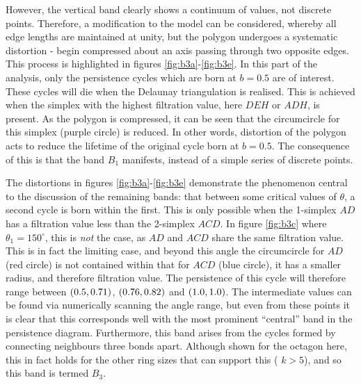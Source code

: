 However, the vertical band clearly shows a continuum of values, not discrete points.
Therefore, a modification to the model can be considered, whereby all edge lengths are maintained at unity, but the polygon undergoes a systematic distortion - begin compressed about an axis passing through two opposite edges.
This process is highlighted in figures \ref{fig:b3a}\--\ref{fig:b3e}.
In this part of the analysis, only the persistence cycles which are born at $b=0.5$ are of interest.
These cycles will die when the Delaunay triangulation is realised.
This is achieved when the simplex with the highest filtration value, here $DEH$ or $ADH$, is present.
As the polygon is compressed, it can be seen that the circumcircle for this simplex (purple circle) is reduced.
In other words, distortion of the polygon acts to reduce the lifetime of the original cycle born at $b=0.5$.
The consequence of this is that the band $B_1$ manifests, instead of a simple series of discrete points.

The distortions in figures \ref{fig:b3a}\--\ref{fig:b3e} demonstrate the phenomenon central to the discussion of the remaining bands: that between some critical values of $\theta$, a second cycle is born within the first.
This is only possible when the 1\--simplex $AD$ has a filtration value less than the 2\--simplex $ACD$.
In figure \ref{fig:b3c} where $\theta_1=150^\circ$, this is \textit{not} the case, as $AD$ and $ACD$ share the same filtration value.
This is in fact the limiting case, and beyond this angle the circumcircle for $AD$ (red circle) is not contained within that for $ACD$ (blue circle), it has a smaller radius, and therefore filtration value.
The persistence of this cycle will therefore range between $\left(0.5,0.71\right)$, $\left(0.76,0.82\right)$ and $\left(1.0,1.0\right)$.
The intermediate values can be found via numerically scanning the angle range, but even from these points it is clear that this corresponds well with the most prominent ``central'' band in the persistence diagram.
Furthermore, this band arises from the cycles formed by connecting neighbours three bonds apart.
Although shown for the octagon here, this in fact holds for the other ring sizes that can support this (\ie{} $k>5$), and so this band is termed $B_3$.

